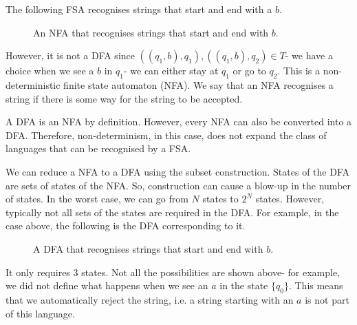 \documentclass[a4paper, openany]{memoir}
\begin{document}
The following FSA recognises strings that start and end with a $b$.
\begin{figure}[H]
    \centering
    \caption{An NFA that recognises strings that start and end with $b$.}
\end{figure}
\noindent However, it is not a DFA since $((q_1, b), q_1), ((q_1, b), q_2) \in T$- we have a choice when we see a $b$ in $q_1$- we can either stay at $q_1$ or go to $q_2$. This is a non-deterministic finite state automaton (NFA). We say that an NFA recognises a string if there is some way for the string to be accepted.

A DFA is an NFA by definition. However, every NFA can also be converted into a DFA. Therefore, non-determinism, in this case, does not expand the class of languages that can be recognised by a FSA.

We can reduce a NFA to a DFA using the subset construction. States of the DFA are sets of states of the NFA. So, construction can cause a blow-up in the number of states. In the worst case, we can go from $N$ states to $2^N$ states. However, typically not all sets of the states are required in the DFA. For example, in the case above, the following is the DFA corresponding to it.
\begin{figure}[H]
    \centering
    \caption{A DFA that recognises strings that start and end with $b$.}
\end{figure}
\noindent It only requires 3 states. Not all the possibilities are shown above- for example, we did not define what happens when we see an $a$ in the state $\{q_0\}$. This means that we automatically reject the string, i.e. a string starting with an $a$ is not part of this language.
\end{document}
